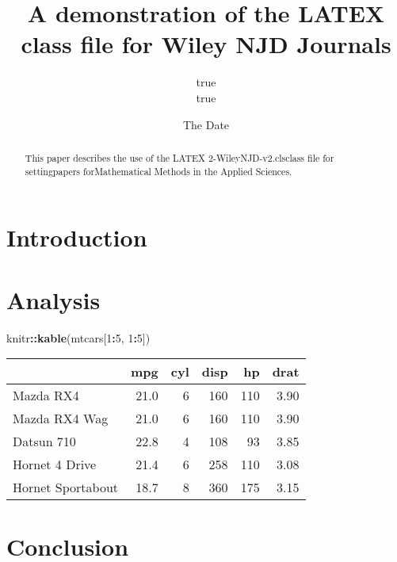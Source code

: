 \documentclass[]{article}
\title{A demonstration of the LATEX class file for Wiley NJD Journals}
\author{true \\ true}
\date{The Date}
\makeatletter
\newenvironment{Shaded}{\begin{snugshade}}{\end{snugshade}}
\newcommand{\DecValTok}[1]{\textcolor[rgb]{0.00,0.00,0.81}{#1}}
\newcommand{\KeywordTok}[1]{\textcolor[rgb]{0.13,0.29,0.53}{\textbf{#1}}}
\newcommand{\NormalTok}[1]{#1}
\newcommand{\OperatorTok}[1]{\textcolor[rgb]{0.81,0.36,0.00}{\textbf{#1}}}
\def@NAT@last@yr{\@citea}%
\def@NAT@last@yr{--\NAT@penalty}%
\makeatother
\begin{document}
\maketitle
\begin{abstract}
This paper describes the use of the LATEX 2-WileyNJD-v2.clsclass file
for settingpapers forMathematical Methods in the Applied Sciences.
\end{abstract}

\hypertarget{introduction}{%
\section{Introduction}\label{introduction}}

\hypertarget{analysis}{%
\section{Analysis}\label{analysis}}

\begin{Shaded}
\begin{Highlighting}[]
\NormalTok{knitr}\OperatorTok{::}\KeywordTok{kable}\NormalTok{(mtcars[}\DecValTok{1}\OperatorTok{:}\DecValTok{5}\NormalTok{, }\DecValTok{1}\OperatorTok{:}\DecValTok{5}\NormalTok{])}
\end{Highlighting}
\end{Shaded}

\begin{longtable}[]{@{}lrrrrr@{}}
\toprule
& mpg & cyl & disp & hp & drat\tabularnewline
\midrule
\endhead
Mazda RX4 & 21.0 & 6 & 160 & 110 & 3.90\tabularnewline
Mazda RX4 Wag & 21.0 & 6 & 160 & 110 & 3.90\tabularnewline
Datsun 710 & 22.8 & 4 & 108 & 93 & 3.85\tabularnewline
Hornet 4 Drive & 21.4 & 6 & 258 & 110 & 3.08\tabularnewline
Hornet Sportabout & 18.7 & 8 & 360 & 175 & 3.15\tabularnewline
\bottomrule
\end{longtable}

\hypertarget{conclusion}{%
\section{Conclusion}\label{conclusion}}
\end{document}
